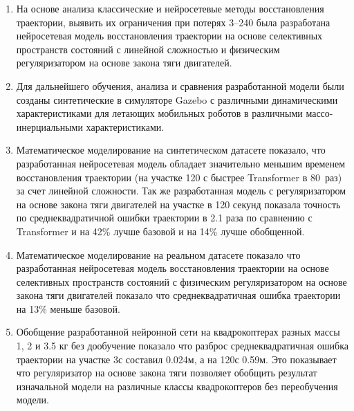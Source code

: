 \begin{enumerate}
  \item На основе анализа классические и нейросетевые методы восстановления траектории,
  выявить их ограничения при потерях 3--240 была разработана нейросетевая модель восстановления 
  траектории на основе селективных пространств состояний с линейной сложностью и физическим регуляризатором
  на основе закона тяги двигателей.
  \item Для дальнейшего обучения, анализа и сравнения разработанной модели были созданы синтетические в симуляторе
  Gazebo с различными динамическими характеристиками для летающих мобильных роботов в различными массо-инерциальными 
  характеристиками. 
  \item Математическое моделирование  на  синтетическом датасете показало, что разработанная нейросетевая модель обладает значительно меньшим 
  временем восстановления траектории (на участке 120 с быстрее Transformer в 80~раз) за счет линейной сложности. 
  Так же разработанная модель с регуляризатором на основе закона тяги двигателей на участке в 120 секунд показала 
  точность по среднеквадратичной ошибки траектории в 2.1 раза по сравнению с Transformer и на 42\% лучше базовой и
  на 14\% лучше обобщенной.
  \item Математическое моделирование на реальном датасете показало что разработанная нейросетевая модель восстановления 
  траектории на основе селективных пространств состояний с физическим регуляризатором на основе закона тяги двигателей показало 
  что среднеквадратичная ошибка траектории на 13\% меньше базовой.
  \item Обобщение разработанной нейронной сети на квадрокоптерах разных массы 1, 2 и 3.5 кг без дообучение показало что 
  разброс среднеквадратичная ошибка траектории на участке 3с составил 0.024м, а на 120с 0.59м. Это показывает что регуляризатор 
  на основе закона тяги позволяет обобщить результат изначальной модели на различные классы квадрокоптеров без переобучения модели. 
\end{enumerate}
